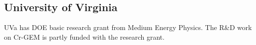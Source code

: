 \subsection{University of Virginia} 
UVa has DOE basic research grant from Medium Energy Physics. The R\&D work on Cr-GEM is partly funded with the research grant.